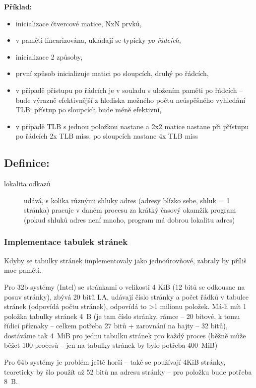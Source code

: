 \documentclass[a4paper, 11pt]{article}
\begin{document}
\textbf{Příklad:}
\begin{itemize}
    \item inicializace čtvercové matice, NxN prvků,
    \item v paměti linearizována, ukládají se typicky \emph{po řádcích},
    \item inicializace 2 způsoby,
    \item první způsob inicializuje matici po sloupcích, druhý po řádcích,
    \item v případě přístupu po řádcích je v souladu s uložením paměti po řádcích -- bude výrazně efektivnější z hlediska možného počtu neúspěšného vyhledání TLB; přístup po sloupcích bude méně efektivní,
    \item v případě TLB s jednou položkou nastane a 2x2 matice nastane při přístupu po řádcích 2x TLB miss, po sloupcích nastane 4x TLB miss
\end{itemize}
 
\subsection*{Definice:}
\begin{description}
\item[lokalita odkazů] udává, s kolika různými shluky adres (adresy blízko sebe, shluk = 1 stránka) pracuje v daném procesu za krátký časový okamžik program (pokud shluků adres není mnoho, program má dobrou lokalitu adres)
\end{description}

\subsubsection{Implementace tabulek stránek}
Kdyby se tabulky stránek implementovaly jako jednoúrovňové, zabraly by příliš moc paměti. 

Pro 32b systémy (Intel) se stránkami o velikosti 4 KiB (12 bitů se odkousne na posuv stránky), zbývá 20 bitů LA, udávají číslo stránky a počet řádků v tabulce stránek (odpovídá počtu stránek), odpovídá to >1 milionu položek. Má-li mít 1 položka tabulky stránek 4~B (je tam číslo stránky, rámce -- 20 bitové, k tomu řídicí příznaky -- celkem potřeba 27 bitů + zarovnání na bajty -- 32 bitů), dostáváme tak 4~MiB pro jednu tabulku stránek pro každý proces (běžně může běžet 100 procesů -- jen na tabulky stránek by bylo potřeba 400~MiB)
 
Pro 64b systémy je problém ještě horší -- také se používají 4KiB stránky, teoreticky by šlo použít až 52 bitů na adresu stránky -- pro položku bude potřeba 8~B.
 
\end{document}

